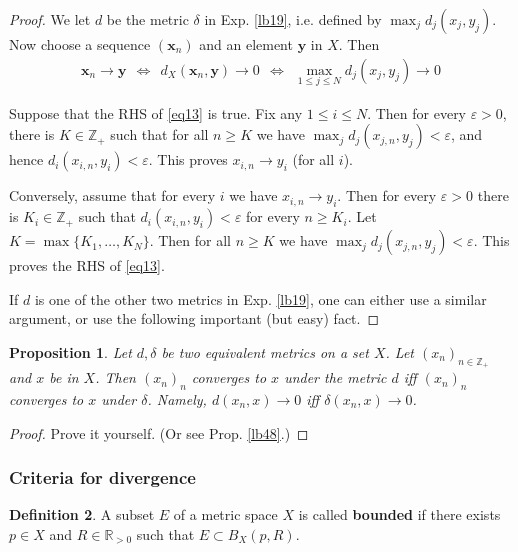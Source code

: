 \documentclass[12pt,b5paper,notitlepage]{article}
\theoremstyle{definition}
\newtheorem{df}{Definition}[section]
\theoremstyle{plain}
\newtheorem{pp}[df]{Proposition}
\newcommand{\mbf}{\mathbf}
\newcommand{\Zbb}{\mathbb Z}
\newcommand{\Rbb}{\mathbb R}
\newcommand{\eps}{\varepsilon}
\numberwithin{equation}{section}
\begin{document}
\begin{proof}
We let $d$ be the metric $\delta$ in Exp. \ref{lb19}, i.e. defined by $\max_j d_j(x_j,y_j)$. Now choose a sequence $(\mbf x_n)$ and an element $\mbf y$ in $X$. Then
\begin{align}
\mbf x_n\rightarrow \mbf y~~\Longleftrightarrow~~ d_X(\mbf x_n,\mbf y)\rightarrow 0 ~~\Longleftrightarrow~~ \max_{1\leq j\leq N} d_j(x_j,y_j)\rightarrow 0  \label{eq13}
\end{align}


Suppose that the RHS of \eqref{eq13} is true. Fix any $1\leq i\leq N$. Then for every $\varepsilon>0$, there is $K\in\Zbb_+$ such that for all $n\geq K$ we have $\max_j d_j(x_{j,n},y_j)<\varepsilon$, and hence $d_i(x_{i,n},y_i)<\varepsilon$. This proves $x_{i,n}\rightarrow y_i$ (for all $i$).

Conversely, assume that for every $i$ we have $x_{i,n}\rightarrow y_i$. Then for every $\eps>0$ there is $K_i\in\Zbb_+$ such that $d_i(x_{i,n},y_i)<\varepsilon$ for every $n\geq K_i$. Let $K=\max\{K_1,\dots,K_N\}$. Then for all $n\geq K$ we have $\max_j d_j(x_{j,n},y_j)<\eps$. This proves the RHS of \eqref{eq13}.

If $d$ is one of the other two metrics in Exp. \ref{lb19}, one can either use a similar argument, or use the following important (but easy) fact.
\end{proof}





\begin{pp}
Let $d,\delta$ be two equivalent metrics on a set $X$. Let $(x_n)_{n\in\Zbb_+}$ and $x$ be in $X$. Then $(x_n)_n$ converges to $x$ under the metric $d$ iff  $(x_n)_n$ converges to $x$ under $\delta$. Namely, $d(x_n,x)\rightarrow 0$ iff $\delta(x_n,x)\rightarrow 0$.
\end{pp}

\begin{proof}
Prove it yourself. (Or see Prop. \ref{lb48}.)
\end{proof}








\subsubsection{Criteria for divergence}

\begin{df}
A subset $E$ of a metric space $X$ is called  \textbf{bounded} if there exists $p\in X$ and $R\in\Rbb_{>0}$ such that $E\subset B_X(p,R)$.
\end{df}
\end{document}
